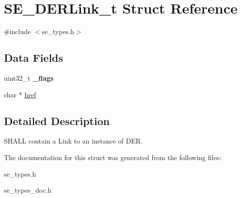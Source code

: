 \hypertarget{structSE__DERLink__t}{}\section{S\+E\+\_\+\+D\+E\+R\+Link\+\_\+t Struct Reference}
\label{structSE__DERLink__t}


{\ttfamily \#include $<$se\+\_\+types.\+h$>$}

\subsection*{Data Fields}
\begin{DoxyCompactItemize}
\item 
uint32\+\_\+t {\bfseries \+\_\+flags}
\item 
char $\ast$ \hyperlink{group__DERLink_gafda2446a3257c158dde0443df06f744a}{href}
\end{DoxyCompactItemize}


\subsection{Detailed Description}
S\+H\+A\+LL contain a Link to an instance of D\+ER. 

The documentation for this struct was generated from the following files\+:\begin{DoxyCompactItemize}
\item 
se\+\_\+types.\+h\item 
se\+\_\+types\+\_\+doc.\+h\end{DoxyCompactItemize}
